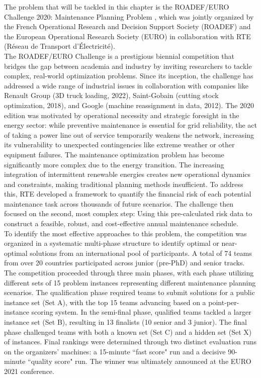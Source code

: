 The problem that will be tackled in this chapter is the ROADEF/EURO Challenge 2020: Maintenance Planning Problem \cite{roadef2020}, which was jointly organized by the French Operational Research and Decision Support Society (ROADEF) and the European Operational Research Society (EURO) in collaboration with RTE (Réseau de Transport d'Électricité).\\

The ROADEF/EURO Challenge is a prestigious biennial competition that bridges the gap between academia and industry by inviting researchers to tackle complex, real-world optimization problems. Since its inception, the challenge has addressed a wide range of industrial issues in collaboration with companies like Renault Group (3D truck loading, 2022), Saint-Gobain (cutting stock optimization, 2018), and Google (machine reassignment in data, 2012). The 2020 edition was motivated by operational necessity and strategic foresight in the energy sector: while preventive maintenance is essential for grid reliability, the act of taking a power line out of service temporarily weakens the network, increasing its vulnerability to unexpected contingencies like extreme weather or other equipment failures. The maintenance optimization problem has become significantly more complex due to the energy transition. The increasing integration of intermittent renewable energies creates new operational dynamics and constraints, making traditional planning methods insufficient. To address this, RTE developed a framework to quantify the financial risk of each potential maintenance task across thousands of future scenarios. The challenge then focused on the second, most complex step: Using this pre-calculated risk data to construct a feasible, robust, and cost-effective annual maintenance schedule.\\

To identify the most effective approaches to this problem, the competition was organized in a systematic multi-phase structure to identify optimal or near-optimal solutions from an international pool of participants. A total of 74 teams from over 20 countries participated across junior (pre-PhD) and senior tracks. The competition proceeded through three main phases, with each phase utilizing different sets of 15 problem instances representing different maintenance planning scenarios. The qualification phase required teams to submit solutions for a public instance set (Set A), with the top 15 teams advancing based on a point-per-instance scoring system. In the semi-final phase, qualified teams tackled a larger instance set (Set B), resulting in 13 finalists (10 senior and 3 junior). The final phase challenged teams with both a known set (Set C) and a hidden set (Set X) of instances. Final rankings were determined through two distinct evaluation runs on the organizers' machines: a 15-minute ``fast score" run and a decisive 90-minute ``quality score" run. The winner was ultimately announced at the EURO 2021 conference.


